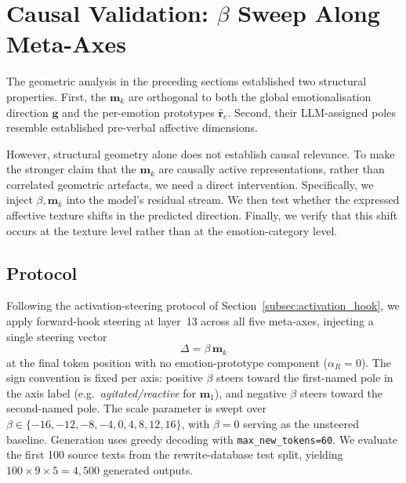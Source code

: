 \section{Causal Validation: $\beta$ Sweep Along Meta-Axes}
\label{sec:ch2-causal-validation}

The geometric analysis in the preceding sections established two structural properties. First, the $\mathbf{m}_k$ are orthogonal to both the global emotionalisation direction $\mathbf{g}$ and the per-emotion prototypes $\hat{\mathbf{r}}_e$. Second, their LLM-assigned poles resemble established pre-verbal affective dimensions.\par

However, structural geometry alone does not establish causal relevance. To make the stronger claim that the $\mathbf{m}_k$ are causally active representations, rather than correlated geometric artefacts, we need a direct intervention. Specifically, we inject $\beta,\mathbf{m}_k$ into the model's residual stream. We then test whether the expressed affective texture shifts in the predicted direction. Finally, we verify that this shift occurs at the texture level rather than at the emotion-category level.\par

\subsection{Protocol}

Following the activation-steering protocol of Section~\ref{subsec:activation_hook}, we apply forward-hook steering at layer~13 across all five meta-axes, injecting a single steering vector
\[
\Delta = \beta\,\mathbf{m}_k
\]
at the final token position with no emotion-prototype component ($\alpha_R = 0$). The sign convention is fixed per axis: positive $\beta$ steers toward the first-named pole in the axis label (e.g.\ \textit{agitated/reactive} for $\mathbf{m}_1$), and negative $\beta$ steers toward the second-named pole. The scale parameter is swept over $\beta \in \{-16,-12,-8,-4,0,4,8,12,16\}$, with $\beta = 0$ serving as the unsteered baseline. Generation uses greedy decoding with \texttt{max\_new\_tokens=60}. We evaluate the first 100 source texts from the rewrite-database test split, yielding $100 \times 9 \times 5 = 4{,}500$ generated outputs.\par

